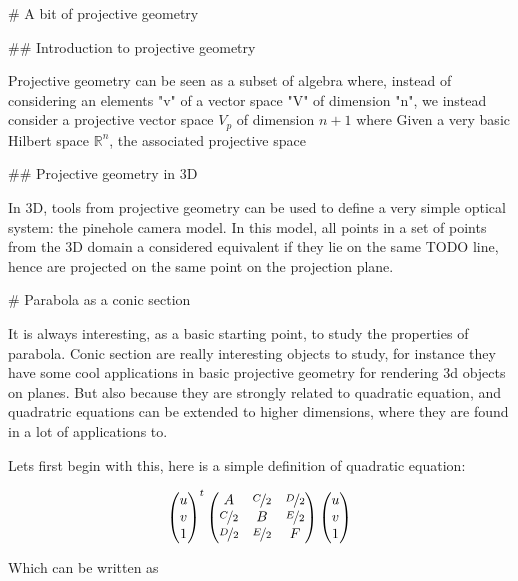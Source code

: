 
# A bit of projective geometry

## Introduction to projective geometry

Projective geometry can be seen as a subset of algebra where, instead of considering an elements "v" of a vector space "V" of dimension "n", we instead consider a projective vector space $V_p$ of dimension $n+1$ where 
Given a very basic Hilbert space $\mathbb{R}^n$, the associated projective space

## Projective geometry in 3D

In 3D, tools from projective geometry can be used to define a very simple optical system: the pinehole camera model. In this model, all points in a set of points from the 3D domain a considered equivalent if they lie on the same TODO line, hence are projected on the same point on the projection plane.

# Parabola as a conic section

It is always interesting, as a basic starting point, to study the properties of parabola.
Conic section are really interesting objects to study, for instance they have some cool applications in basic projective geometry for rendering 3d objects on planes. But also because they are strongly related to quadratic equation, and quadratric equations can be extended to higher dimensions, where they are found in a lot of applications to.

Lets first begin with this, here is a simple definition of quadratic equation:

\begin{align}

\begin{pmatrix}u \\ v \\ 1\end{pmatrix}^{t}
\begin{pmatrix}
    A               & \nicefrac{C}{2} & \nicefrac{D}{2}\\
    \nicefrac{C}{2} & B               & \nicefrac{E}{2}\\
    \nicefrac{D}{2} & \nicefrac{E}{2} & F
\end{pmatrix}
\begin{pmatrix}u \\ v \\ 1\end{pmatrix}
\end{align}

Which can be written as

